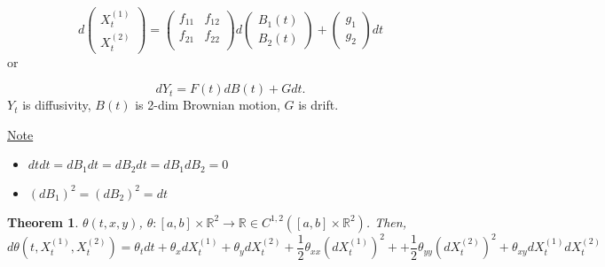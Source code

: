 \documentclass[12pt]{report}
\newcommand{\R}{\mathbb{R}}
\renewcommand{\1}{\mathbb{1}}
\theoremstyle{break}
\newtheorem{thm}{Theorem}[section] %
\theoremstyle{newdef}
\theoremstyle{remark}
\begin{document}
$$
d
\begin{pmatrix}
X_t^{(1)}\\
X_t^{(2)}
\end{pmatrix}
=
\begin{pmatrix}
f_{11} & f_{12}\\
f_{21} & f_{22}\\
\end{pmatrix}
d
\begin{pmatrix}
B_1(t)\\
B_2(t)
\end{pmatrix}
+
\begin{pmatrix}
g_1\\
g_2
\end{pmatrix}
dt
$$
or

$$
dY_t = F(t) dB(t) + G dt.
$$
$Y_t$ is diffusivity, $B(t)$ is 2-dim Brownian motion, $G$ is drift.

\underline{Note}
\begin{itemize}
\item $dt dt = dB_1 dt = dB_2 dt = dB_1 dB_2 = 0$
\item $(dB_1)^2 = (dB_2)^2 = dt$
\end{itemize}


\begin{thm}
$\theta(t,x,y)$, $\theta: [a,b] \times \R^2 \rightarrow \R \in C^{1,2}([a,b]\times\R^2)$.
Then,
$$
d\theta(t, X_t^{(1)}, X_t^{(2)})
= \theta_t dt + \theta_x dX_t^{(1)} + \theta_y dX_t^{(2)}
+ \frac12 \theta_{xx}\left(dX_t^{(1)}\right)^2 + 
+ \frac12 \theta_{yy}\left(dX_t^{(2)}\right)^2 + 
\theta_{xy} dX_t^{(1)}dX_t^{(2)}
$$
\end{thm}
\end{document}

